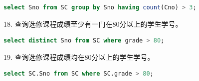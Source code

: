 \documentclass[12pt, a4paper]{report}
\begin{document}
\begin{lstlisting}[language=SQL]
    select Sno from SC group by Sno having count(Cno) > 3;
\end{lstlisting}

\begin{figure}[H] %
    \centering %
\end{figure}

18. 查询选修课程成绩至少有一门在80分以上的学生学号。\\

\begin{lstlisting}[language=SQL]
    select distinct Sno from SC where grade > 80;
\end{lstlisting}

\begin{figure}[H] %
    \centering %
\end{figure}

19. 查询选修课程成绩均在80分以上的学生学号。\\

\begin{lstlisting}[language=SQL]
    select SC.Sno from SC where SC.grade > 80;
\end{lstlisting}

\begin{figure}[H] %
    \centering %
\end{figure}
\end{document}
